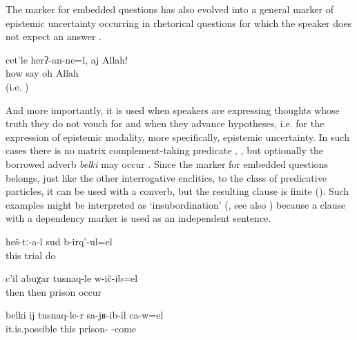 The marker for embedded questions has also evolved into a general marker of epistemic uncertainty occurring in rhetorical questions for which the speaker does not expect an answer .
%
\begin{exe}
	\ex	\label{ex:How should this be said, oh, Allah!A}
	\gll	cet'le	herʔ-an-ne=l,	aj	Allah!\\
		how	say	oh	Allah\\
	\glt	{} (i.e. )
\end{exe}

And more importantly, it is used when speakers are expressing thoughts whose truth they do not vouch for and when they advance hypotheses, i.e. for the expression of epistemic modality, more specifically, epistemic uncertainty. In such cases there is no matrix complement-taking predicate , , but optionally the borrowed adverb \textit{belki} may occur . Since the marker for embedded questions belongs, just like the other interrogative enclitics, to the class of predicative particles, it can be used with a converb, but the resulting clause is finite (). Such examples might be interpreted as `insubordination' (\citealp{Evans2007, EvansWatanabe2016}, see also \citealp{Mithun2008}) because a clause with a dependency marker is used as an independent sentence. 
%
\begin{exe}
	\ex	\label{ex:They are making a trial or what}
	\gll	heš-tː-a-l	sud	b-irq'-ul=el\\
		this	trial	do\\
	\glt	{}

	\ex	\label{ex:Then he went to prison or so / or what}
	\gll	c'il	abuχar	tusnaq-le	w-ič-ib=el\\
		then	then	prison	occur\\
	\glt	{}

	\ex	\label{ex:‎Maybe this is when he came from prison}
	\gll	belki	ij	tusnaq-le-r	sa-jʁ-ib-il	ca-w=el\\
		it.is.possible	this	prison-	-come	\\
	\glt	{}
\end{exe}

